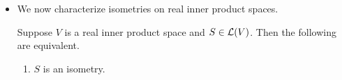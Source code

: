\documentclass[../main.tex]{subfiles}
\begin{document}
\begin{itemize}
\begin{theorem}
\begin{proof}
            Now suppose that (b) holds. Then using Exercise \ref{exr:8.B.9}, to show that $TT^*=T^*T$, it will suffice to show that all submatrices along the diagonal commute, too. The $1\times 1$ submatrices obviously commute, and the $2\times 2$ ones commute since
            \begin{align*}
                T_jT_j^* &=
                \begin{pmatrix}
                    a & -b\\
                    b & a\\
                \end{pmatrix}
                \begin{pmatrix}
                    a & b\\
                    -b & a\\
                \end{pmatrix}\\
                &=
                \begin{pmatrix}
                    a^2+b^2 & 0\\
                    0 & a^2+b^2\\
                \end{pmatrix}\\
                &=
                \begin{pmatrix}
                    a & b\\
                    -b & a\\
                \end{pmatrix}
                \begin{pmatrix}
                    a & -b\\
                    b & a\\
                \end{pmatrix}\\
                &= T_j^*T_j
            \end{align*}
            as desired.
        \end{proof}
    \end{theorem}
    \item {}We now characterize isometries on real inner product spaces.
    \begin{theorem}
        Suppose $V$ is a real inner product space and $S\in\mathcal{L}(V)$. Then the following are equivalent.
        \begin{enumerate}[label={\textup{(}\alph*\textup{)}}]
            \item $S$ is an isometry.

\end{enumerate}
\end{theorem}
\end{itemize}
\end{document}
